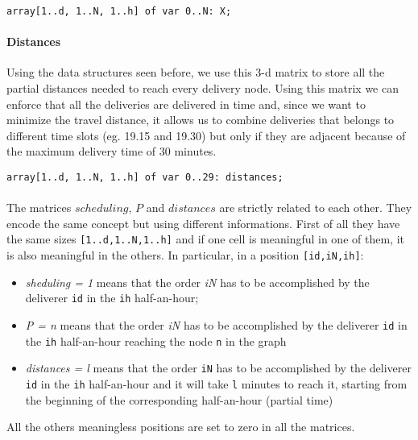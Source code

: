 \documentclass[10pt]{article}
\begin{document}
	\begin{center}
		\texttt{array[1..d, 1..N, 1..h] of var 0..N: X;}
	\end{center}

	\paragraph*{Distances}
	Using the data structures seen before, we use this 3-d matrix to store all
	the partial distances needed to reach every delivery node. Using this matrix we can 
	enforce that all the deliveries are delivered in time and, since we want to minimize 
	the travel distance, it allows us to combine deliveries that belongs to different
	time slots (eg. 19.15 and 19.30) but only if they are adjacent because of the maximum 
	delivery time of 30 minutes.

	\begin{center}
		\texttt{array[1..d, 1..N, 1..h] of var 0..29: distances;}
	\end{center}

	\paragraph*{}
	The matrices $scheduling$, $P$ and $distances$ are strictly related to each other.
	They encode the same concept but using different informations. First of
	all they have the same sizes \texttt{[1..d,1..N,1..h]} and if one cell is meaningful in
	one	of them, it is also meaningful in the others.
	In particular, in a position 
	\texttt{[id,iN,ih]}:
	\begin{itemize}
		\item \textit{sheduling = 1} means that the order \textit{iN} has to be
		accomplished by the deliverer \texttt{id} in the \texttt{ih} half-an-hour;
		\item \textit{P = n} means that the order \textit{iN} has to be
		accomplished by the deliverer \texttt{id} in the \texttt{ih} half-an-hour 
		reaching the node \texttt{n} in the graph
		\item \textit{distances = l} means that the order \texttt{iN} has to be
		accomplished by the deliverer \texttt{id} in the \texttt{ih} half-an-hour 
		and it will take \texttt{l} minutes to reach it, starting from the beginning of the
		corresponding half-an-hour (partial time) 
		 
	\end{itemize}
	All the others meaningless positions are set to zero in all the matrices.
\end{document}
